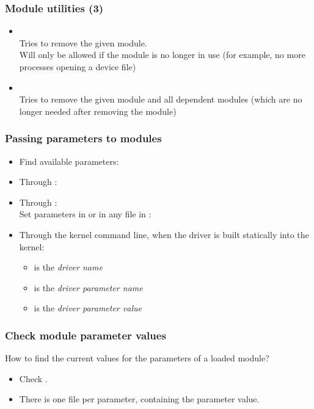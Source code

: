 \begin{frame}
  \frametitle{Module utilities (3)}
  \begin{itemize}
  \item {}\\
    Tries to remove the given module.\\
    Will only be allowed if the module is no longer in use (for
    example, no more processes opening a device file)
  \item {}\\
    Tries to remove the given module and all dependent modules (which
    are no longer needed after removing the module)
  \end{itemize}
\end{frame}

\begin{frame}
  \frametitle{Passing parameters to modules}
  \begin{itemize}
  \item Find available parameters:\\
  \item Through :\\
  \item Through :\\
    Set parameters in  or in any file in :\\
  \item Through the kernel command line, when the driver is built statically into the kernel:\\
    \begin{itemize}
    \item {} is the {\em driver name}
    \item {} is the {\em driver parameter name}
    \item {} is the {\em driver parameter value}
    \end{itemize}
  \end{itemize}
\end{frame}

\begin{frame}
  \frametitle{Check module parameter values}
  How to find the current values for the parameters of a loaded module?
  \begin{itemize}
  \item Check .
  \item There is one file per parameter, containing the parameter value.
  \end{itemize}
\end{frame}

